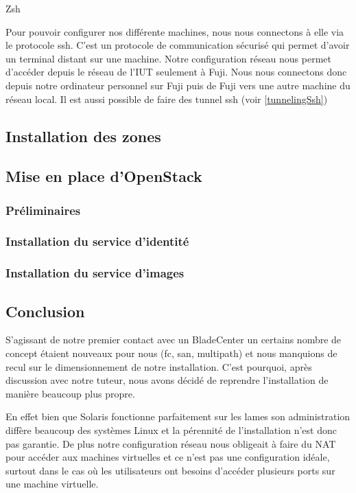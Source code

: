 \documentclass[a4paper,oneside]{report}
\begin{document}
Zsh


Pour pouvoir configurer nos différente machines, nous nous connectons à elle via le protocole \gls{ssh}. 
C'est un protocole de communication sécurisé qui permet d'avoir un terminal distant sur une machine.
Notre configuration réseau nous permet d'accéder depuis le réseau de l'IUT seulement à Fuji.
Nous nous connectons donc depuis notre ordinateur personnel sur Fuji puis de Fuji vers une autre machine du réseau local.
Il est aussi possible de faire des tunnel \gls{ssh} (voir \ref{tunnelingSsh})

\subsection{Installation des zones}

\subsection{Mise en place d'OpenStack}
\subsubsection{Préliminaires}

\subsubsection{Installation du service d'identité}

\subsubsection{Installation du service d'images}

\subsection{Conclusion}
S'agissant de notre premier contact avec un BladeCenter un certains nombre de concept étaient nouveaux pour nous (\gls{fc}, \gls{san}, multipath) et nous manquions de recul sur le dimensionnement de notre installation.
C'est pourquoi, après discussion avec notre tuteur, nous avons décidé de reprendre l'installation de manière beaucoup plus propre.

En effet bien que Solaris fonctionne parfaitement sur les lames son administration diffère beaucoup des systèmes Linux et la pérennité de l'installation n'est donc pas garantie.\newline
De plus notre configuration réseau nous obligeait à faire du NAT pour accéder aux machines virtuelles et ce n'est pas une configuration idéale, surtout dans le cas où les utilisateurs ont besoins d'accéder plusieurs ports sur une machine virtuelle.
\end{document}
